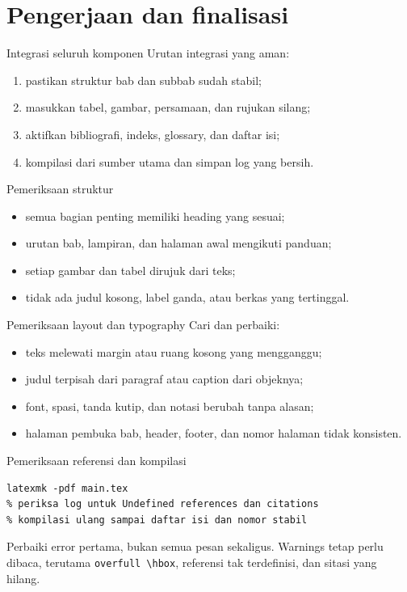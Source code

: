 \documentclass[aspectratio=169,11pt]{beamer}
\begin{document}
\section{Pengerjaan dan finalisasi}
\begin{frame}{Integrasi seluruh komponen}
Urutan integrasi yang aman:
\begin{enumerate}
\item pastikan struktur bab dan subbab sudah stabil;
\item masukkan tabel, gambar, persamaan, dan rujukan silang;
\item aktifkan bibliografi, indeks, glossary, dan daftar isi;
\item kompilasi dari sumber utama dan simpan log yang bersih.
\end{enumerate}
\end{frame}
\begin{frame}{Pemeriksaan struktur}
\begin{itemize}
\item semua bagian penting memiliki heading yang sesuai;
\item urutan bab, lampiran, dan halaman awal mengikuti panduan;
\item setiap gambar dan tabel dirujuk dari teks;
\item tidak ada judul kosong, label ganda, atau berkas yang tertinggal.
\end{itemize}
\end{frame}
\begin{frame}{Pemeriksaan layout dan typography}
Cari dan perbaiki:
\begin{itemize}
\item teks melewati margin atau ruang kosong yang mengganggu;
\item judul terpisah dari paragraf atau caption dari objeknya;
\item font, spasi, tanda kutip, dan notasi berubah tanpa alasan;
\item halaman pembuka bab, header, footer, dan nomor halaman tidak konsisten.
\end{itemize}
\end{frame}
\begin{frame}[fragile]{Pemeriksaan referensi dan kompilasi}
\begin{lstlisting}[style=terminal]
latexmk -pdf main.tex
% periksa log untuk Undefined references dan citations
% kompilasi ulang sampai daftar isi dan nomor stabil
\end{lstlisting}
Perbaiki error pertama, bukan semua pesan sekaligus. Warnings tetap perlu
dibaca, terutama \texttt{overfull \textbackslash hbox}, referensi tak terdefinisi,
dan sitasi yang hilang.
\end{frame}
\end{document}
